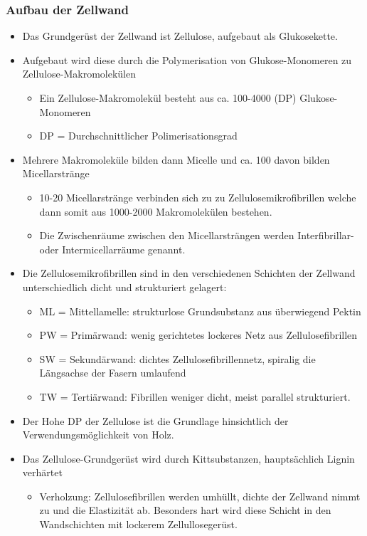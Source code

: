 \documentclass{article}
\begin{document}
\subsubsection{Aufbau der Zellwand}
\begin{itemize}
  \item Das Grundgerüst der Zellwand ist Zellulose, aufgebaut als Glukosekette.
  \item Aufgebaut wird diese durch die Polymerisation von Glukose-Monomeren zu
        Zellulose-Makromolekülen 
        \begin{itemize}
          \item Ein Zellulose-Makromolekül besteht aus ca. 100-4000 (DP)
                Glukose-Monomeren
          \item DP = Durchschnittlicher Polimerisationsgrad
        \end{itemize}
   \item Mehrere Makromoleküle bilden dann Micelle und ca. 100 davon bilden
         Micellarstränge
         \begin{itemize}
           \item 10-20 Micellarstränge verbinden sich zu zu 
                 Zellulosemikrofibrillen welche dann somit aus 1000-2000
                 Makromolekülen bestehen.
           \item Die Zwischenräume zwischen den Micellarsträngen werden
                 Interfibrillar- oder Intermicellarräume genannt.
         \end{itemize}
    \item Die Zellulosemikrofibrillen sind in den verschiedenen Schichten der Zellwand
          unterschiedlich dicht und strukturiert gelagert:
          \begin{itemize}
            \item ML = Mittellamelle: strukturlose Grundsubstanz aus überwiegend Pektin
            \item PW = Primärwand: wenig gerichtetes lockeres Netz aus Zellulosefibrillen
            \item SW = Sekundärwand: dichtes Zellulosefibrillennetz, spiralig
                  die Längsachse der Fasern umlaufend
            \item TW = Tertiärwand: Fibrillen weniger dicht, meist parallel strukturiert.
          \end{itemize}
     \item Der Hohe DP der Zellulose ist die Grundlage hinsichtlich der
           Verwendungsmöglichkeit von Holz.
     \item Das Zellulose-Grundgerüst wird durch Kittsubstanzen, hauptsächlich Lignin
           verhärtet
           \begin{itemize}
             \item Verholzung: Zellulosefibrillen werden umhüllt, dichte der
                   Zellwand nimmt zu und die Elastizität ab. Besonders hart wird
                   diese Schicht in den Wandschichten mit lockerem
                   Zellullosegerüst.
           \end{itemize}
           
     \end{itemize}
\end{document}
